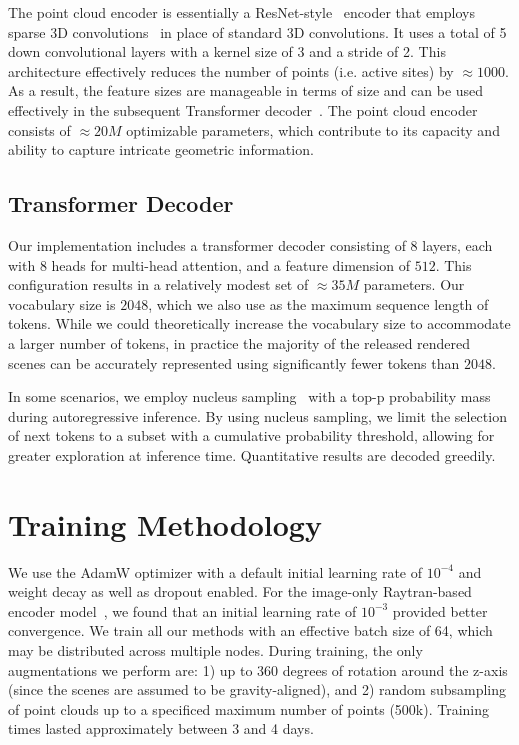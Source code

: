 The point cloud encoder is essentially a ResNet-style~\cite{he2016deep} encoder that employs sparse 3D convolutions~\cite{tang2020searching,tang2022torchsparse} in place of standard 3D convolutions. It uses a total of 5 down convolutional layers with a kernel size of 3 and a stride of 2. This architecture effectively reduces the number of points (i.e. active sites) by $\approx 1000$. As a result, the feature sizes are manageable in terms of size and can be used effectively in the subsequent Transformer decoder~\cite{vaswani2017attention}. The point cloud encoder consists of $\approx 20M$ optimizable parameters, which contribute to its capacity and ability to capture intricate geometric information.

\subsection{Transformer Decoder}
\label{app:decoder}

Our implementation includes a transformer decoder consisting of 8 layers, each with 8 heads for multi-head attention, and a feature dimension of $512$. This configuration results in a relatively modest set of $\approx 35M$ parameters. Our vocabulary size is $2048$, which we also use as the maximum sequence length of tokens. While we could theoretically increase the vocabulary size to accommodate a larger number of tokens, in practice the majority of the released rendered scenes can be accurately represented using significantly fewer tokens than $2048$. 

In some scenarios, we employ nucleus sampling~\cite{holtzman2019curious} with a top-p probability mass during autoregressive inference. By using nucleus sampling, we limit the selection of next tokens to a subset with a cumulative probability threshold, allowing for greater exploration at inference time. Quantitative results are decoded greedily.

\section{Training Methodology}

We use the AdamW optimizer 
with a default initial learning rate of $10^{-4}$ and
weight decay as well as dropout enabled.
For the image-only Raytran-based encoder model~\cite{tyszkiewicz2022raytran},
we found that an initial learning rate of $10^{-3}$ provided better convergence.
We train all our methods with an effective batch size of 64, which may be distributed across multiple nodes. 
During training, the only augmentations we perform are: 1) up to 360 degrees of rotation around the z-axis (since the scenes are assumed to be gravity-aligned), and 2) random subsampling of point clouds up to a specificed maximum number of points (500k). 
Training times lasted approximately between 3 and 4 days. 

